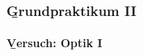 \documentclass{beamer}
\author{ \textbf{Oxana Maurer},\\  Jannik Lüke,\\ Christian Eckhardt,\\ Jonathan Conrad}
\date{\today}
\begin{document}
\begin{frame}
\frametitle{\b{Grundpraktikum II}}
\framesubtitle{\b{Versuch: Optik I}}
\titlepage
\end{frame}

\begin{frame}
\tableofcontents
\end{frame}





%
\end{document}
